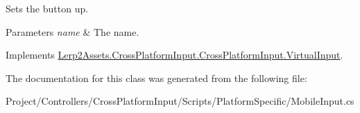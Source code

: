 Sets the button up. 


\begin{DoxyParams}{Parameters}
{\em name} & The name.\\
\hline
\end{DoxyParams}


Implements \hyperlink{class_lerp2_assets_1_1_cross_platform_input_1_1_cross_platform_input_1_1_virtual_input_ae813c350c71501f35ed2aefa375b233c}{Lerp2\+Assets.\+Cross\+Platform\+Input.\+Cross\+Platform\+Input.\+Virtual\+Input}.



The documentation for this class was generated from the following file\+:\begin{DoxyCompactItemize}
\item 
Project/\+Controllers/\+Cross\+Platform\+Input/\+Scripts/\+Platform\+Specific/Mobile\+Input.\+cs\end{DoxyCompactItemize}
